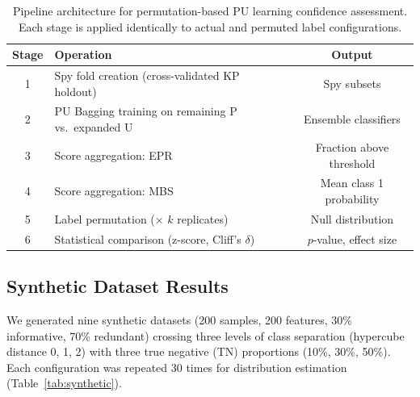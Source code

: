 \documentclass[11pt]{article}
\begin{document}
\begin{table}[H]
\centering
\caption{Pipeline architecture for permutation-based PU learning confidence assessment. Each stage is applied identically to actual and permuted label configurations.}
\label{tab:pipeline}
\begin{tabular}{clc}
\toprule
\textbf{Stage} & \textbf{Operation} & \textbf{Output} \\
\midrule
1 & Spy fold creation (cross-validated KP holdout) & Spy subsets \\
2 & PU Bagging training on remaining P vs.\ expanded U & Ensemble classifiers \\
3 & Score aggregation: EPR & Fraction above threshold \\
4 & Score aggregation: MBS & Mean class 1 probability \\
5 & Label permutation ($\times$ $k$ replicates) & Null distribution \\
6 & Statistical comparison (z-score, Cliff's $\delta$) & $p$-value, effect size \\
\bottomrule
\end{tabular}
\end{table}

\subsection{Synthetic Dataset Results}

We generated nine synthetic datasets (200 samples, 200 features, 30\% informative, 70\% redundant) crossing three levels of class separation (hypercube distance 0, 1, 2) with three true negative (TN) proportions (10\%, 30\%, 50\%). Each configuration was repeated 30 times for distribution estimation (Table~\ref{tab:synthetic}).
\end{document}
